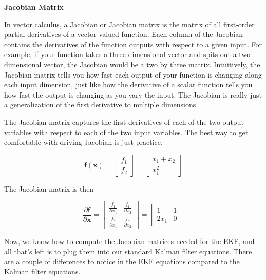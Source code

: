 \begin{framed}
\theoremstyle{remark}
\begin{remark}{\textbf{Jacobian Matrix}}

In vector calculus, a Jacobian or Jacobian matrix is the matrix of all
first-order partial derivatives of a vector valued function. Each column of the Jacobian
contains the derivatives of the function outputs with
respect to a given input. For example, if your function takes a three-dimensional vector and
spits out a two-dimensional vector, the Jacobian would be
a two by three matrix. Intuitively, the Jacobian matrix
tells you how fast each output of your function is changing
along each input dimension, just like how the derivative
of a scalar function tells you how fast the output is
changing as you vary the input. The Jacobian is really
just a generalization of the first derivative
to multiple dimensions. 

The Jacobian matrix captures the first derivatives of each of the two output variables with respect
to each of the two input variables. The best way to get comfortable with driving Jacobian is just practice. 

\begin{equation}
\mathbf{f}(\mathbf{x}) = 
\begin{bmatrix}
f_1 \\
f_2
\end{bmatrix} = 
\begin{bmatrix}
x_1 + x_2 \\
x_{1}^2
\end{bmatrix}
\end{equation}

The Jacobian matrix is then

\begin{equation}
\frac{\partial \mathbf{f}}{\partial \mathbf{x}} = 
\begin{bmatrix}
\frac{f_1}{\partial x_1} & \frac{f_1}{\partial x_2}  \\
\frac{f_2}{\partial x_1} & \frac{f_2}{\partial x_2}
\end{bmatrix} = 
\begin{bmatrix}
1 & 1 \\
2x_1 & 0 
\end{bmatrix}
\end{equation}


\end{remark}
\end{framed}

Now, we know how to compute the Jacobian matrices needed for the EKF, and all that's left is to plug them into our standard Kalman
filter equations. There are a couple of differences to notice in the EKF equations compared to the Kalman filter equations.

